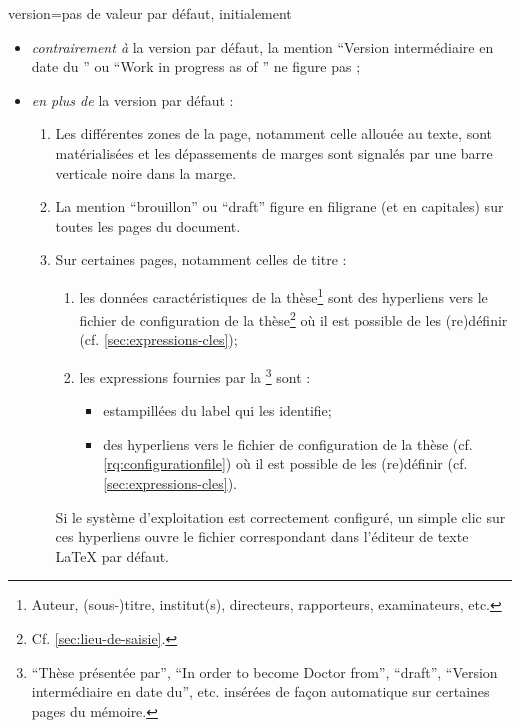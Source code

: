 {\begin{docKey}{version}{=\textbar{}\textbar{}\textbar{}\textbar{}\textbar{}}{pas
      de valeur par défaut, initialement }
\begin{description}
\begin{itemize}
        signale l'omission ;
      \item \emph{contrairement à} la version par défaut, la mention \enquote{Version
          intermédiaire en date du } ou \foreignquote{english}{Work
          in progress as of } ne figure pas ;
      \item \emph{en plus de} la version par défaut :
        \begin{enumerate}
        \item Les différentes zones de la page, notamment celle allouée au
          texte, sont matérialisées et les dépassements de marges sont signalés
          par une barre verticale noire dans la marge.
        \item La mention \enquote{brouillon} ou
          \foreignquote{english}{draft}\selonlangue{} figure en filigrane (et
          en capitales) sur toutes les pages du document.
        \item Sur certaines pages, notamment celles de titre :
          \begin{enumerate}
          \item les données caractéristiques de la thèse\footnote{Auteur,
              (sous-)titre, institut(s), directeurs, rapporteurs, examinateurs,
              etc.} sont des hyperliens vers le fichier de configuration de la
            thèse\footnote{Cf. \vref{sec:lieu-de-saisie}.} où il est possible
            de les (re)définir (cf. \vref{sec:expressions-cles});
          \item\label{item-expression} les expressions fournies par la
            \yatcl\footnote{\enquote{Thèse présentée par},
              \foreignquote{english}{In order to become Doctor from},
              \foreignquote{english}{draft}, \enquote{Version intermédiaire en
                date du}, etc. insérées de façon automatique sur certaines
              pages du mémoire.} sont :
            \begin{itemize}
            \item estampillées du label qui les identifie;
            \item des hyperliens vers le fichier de configuration de la thèse
              (cf.  \vref{rq:configurationfile}) où il est possible de les
              (re)définir (cf. \vref{sec:expressions-cles}).
            \end{itemize}
          \end{enumerate}
          Si le système d'exploitation est correctement configuré, un simple
          clic sur ces hyperliens ouvre le fichier correspondant dans l'éditeur
          de texte \LaTeX{} par défaut.
        \end{enumerate}
      \end{itemize}
    \end{description}
  \end{docKey}
}


